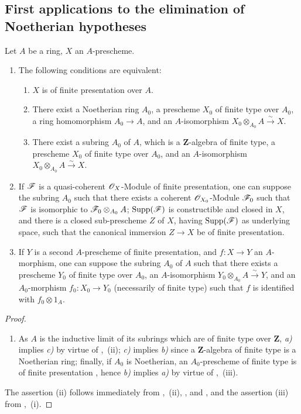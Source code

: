 \subsection{First applications to the elimination of Noetherian hypotheses}
\label{subsection:IV.8.9}

\begin{proposition}[8.9.1]
\label{IV.8.9.1}
Let $A$ be a ring, $X$ an $A$-prescheme.
\begin{enumerate}[label=\textup{(\roman*)}]
\item The following conditions are equivalent:
\begin{enumerate}[label=\emph{\alph*)}]
\item $X$ is of finite presentation over $A$.
\item There exist a Noetherian ring $A_0$, a prescheme $X_0$ of finite type over $A_0$, a ring homomorphism $A_0\to A$, and an $A$-isomorphism $X_0\otimes_{A_0}A\xrightarrow{\sim}X$.
\item There exist a subring $A_0$ of $A$, which is a $\mathbf{Z}$-algebra of finite type, a prescheme $X_0$ of finite type over $A_0$, and an $A$-isomorphism $X_0\otimes_{A_0}A\xrightarrow{\sim}X$.
\end{enumerate}
\item If $\mathscr{F}$ is a quasi-coherent $\mathscr{O}_X$-Module of finite presentation, one can suppose the subring $A_0$ such that there exists a coherent $\mathscr{O}_{X_0}$-Module $\mathscr{F}_0$ such that $\mathscr{F}$ is isomorphic to $\mathscr{F}_0\otimes_{A_0}A$; $\operatorname{Supp}(\mathscr{F})$ is constructible and closed in $X$, and there is a closed sub-prescheme $Z$ of $X$, having $\operatorname{Supp}(\mathscr{F})$ as underlying space, such that the canonical immersion $Z\to X$ be of finite presentation.
\item If $Y$ is a second $A$-prescheme of finite presentation, and $f:X\to Y$ an $A$-morphism, one can suppose the subring $A_0$ of $A$ such that there exists a prescheme $Y_0$ of finite type over $A_0$, an $A$-isomorphism $Y_0\otimes_{A_0}A\xrightarrow{\sim}Y$, and an $A_0$-morphism $f_0:X_0\to Y_0$ (necessarily of finite type) such that $f$ is identified with $f_0\otimes 1_A$.
\end{enumerate}
\end{proposition}

\begin{proof}
\begin{enumerate}[label=(\roman*)]
\item As $A$ is the inductive limit of its subrings which are of finite type over $\mathbf{Z}$, \emph{a)} implies \emph{c)} by virtue of ,~(ii); \emph{c)} implies \emph{b)} since a $\mathbf{Z}$-algebra of finite type is a Noetherian ring; finally, if $A_0$ is Noetherian, an $A_0$-prescheme of finite type is of finite presentation , hence \emph{b)} implies \emph{a)} by virtue of ,~(iii).
\end{enumerate}
The assertion (ii) follows immediately from ,~(ii), , and , and the assertion (iii) from ,~(i).
\end{proof}

